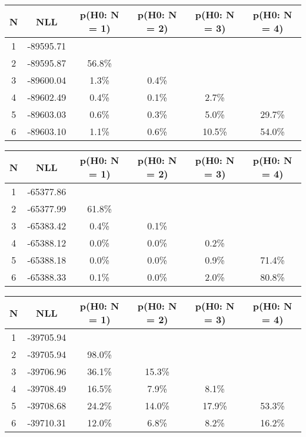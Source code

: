 \begin{table}[htb]
	\begin{center}
{\footnotesize\renewcommand{\arraystretch}{1.4}
		\begin{tabular}{cc||cccc}
			N & NLL & p(H0: N = 1) & p(H0: N = 2) & p(H0: N = 3) & p(H0: N = 4)\\ 
		\hline
1 & -89595.71 & & & & \\
2 & -89595.87 & 56.8\% & & & \\
3 & -89600.04 & 1.3\% & 0.4\% & & \\
4 & -89602.49 & 0.4\% & 0.1\% & 2.7\% & \\
5 & -89603.03 & 0.6\% & 0.3\% & 5.0\% & 29.7\% \\
6 & -89603.10 & 1.1\% & 0.6\% & 10.5\% & 54.0\% \\
	\end{tabular}
		\label{tab:lab}
	}
	\end{center}\end{table}

\begin{table}[htb]
	\begin{center}
{\footnotesize\renewcommand{\arraystretch}{1.4}
		\begin{tabular}{cc||cccc}
			N & NLL & p(H0: N = 1) & p(H0: N = 2) & p(H0: N = 3) & p(H0: N = 4)\\ 
		\hline
1 & -65377.86 & & & & \\
2 & -65377.99 & 61.8\% & & & \\
3 & -65383.42 & 0.4\% & 0.1\% & & \\
4 & -65388.12 & 0.0\% & 0.0\% & 0.2\% & \\
5 & -65388.18 & 0.0\% & 0.0\% & 0.9\% & 71.4\% \\
6 & -65388.33 & 0.1\% & 0.0\% & 2.0\% & 80.8\% \\
	\end{tabular}
		\label{tab:lab}
	}
	\end{center}\end{table}

\begin{table}[htb]
	\begin{center}
{\footnotesize\renewcommand{\arraystretch}{1.4}
		\begin{tabular}{cc||cccc}
			N & NLL & p(H0: N = 1) & p(H0: N = 2) & p(H0: N = 3) & p(H0: N = 4)\\ 
		\hline
1 & -39705.94 & & & & \\
2 & -39705.94 & 98.0\% & & & \\
3 & -39706.96 & 36.1\% & 15.3\% & & \\
4 & -39708.49 & 16.5\% & 7.9\% & 8.1\% & \\
5 & -39708.68 & 24.2\% & 14.0\% & 17.9\% & 53.3\% \\
6 & -39710.31 & 12.0\% & 6.8\% & 8.2\% & 16.2\% \\
	\end{tabular}
		\label{tab:lab}
	}
	\end{center}\end{table}

